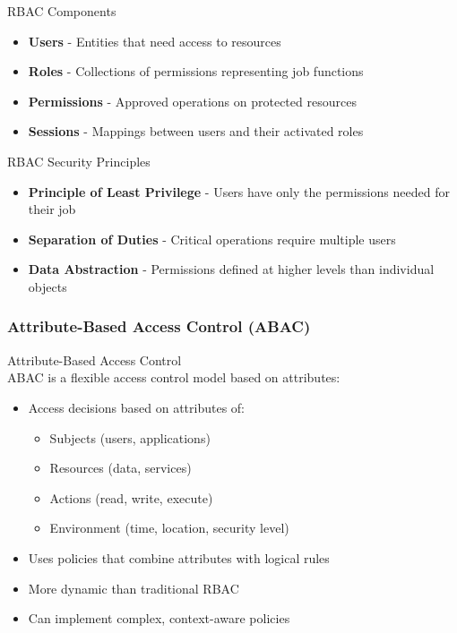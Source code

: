\begin{concept}{RBAC Components}
\begin{itemize}
    \item \textbf{Users} - Entities that need access to resources
    \item \textbf{Roles} - Collections of permissions representing job functions
    \item \textbf{Permissions} - Approved operations on protected resources
    \item \textbf{Sessions} - Mappings between users and their activated roles
\end{itemize}
\end{concept}

\begin{theorem}{RBAC Security Principles}
\begin{itemize}
    \item \textbf{Principle of Least Privilege} - Users have only the permissions needed for their job
    \item \textbf{Separation of Duties} - Critical operations require multiple users
    \item \textbf{Data Abstraction} - Permissions defined at higher levels than individual objects
\end{itemize}
\end{theorem}

\subsubsection{Attribute-Based Access Control (ABAC)}

\begin{definition}{Attribute-Based Access Control}\\
ABAC is a flexible access control model based on attributes:
\begin{itemize}
    \item Access decisions based on attributes of:
    \begin{itemize}
        \item Subjects (users, applications)
        \item Resources (data, services)
        \item Actions (read, write, execute)
        \item Environment (time, location, security level)
    \end{itemize}
    \item Uses policies that combine attributes with logical rules
    \item More dynamic than traditional RBAC
    \item Can implement complex, context-aware policies
\end{itemize}
\end{definition}

